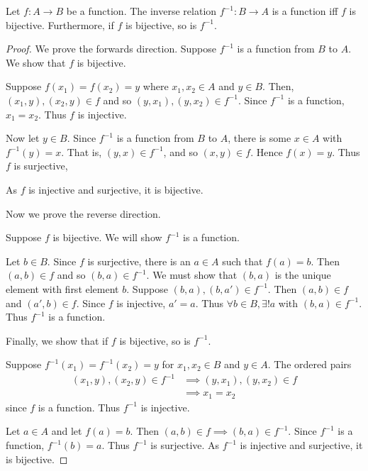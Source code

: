 \documentclass{article}
\begin{document}
    \begin{theorem}
      Let $f: A \to B$ be a function. The inverse relation $f^{-1}: B \to A$ is a function iff $f$ is bijective. Furthermore, if $f$ is bijective, so is $f^{-1}$.
    \end{theorem}
    \begin{proof}
      We prove the forwards direction.
      Suppose $f^{-1}$ is a function from $B$ to $A$. We show that $f$ is bijective.

      Suppose $f(x_1) = f(x_2) = y$ where $x_1, x_2 \in A$ and $y \in B$.
      Then, $(x_1, y), (x_2, y) \in f$ and so $(y, x_1), (y, x_2) \in f^{-1}$. Since $f^{-1}$ is a function, $x_1 = x_2$.
      Thus $f$ is injective.

      Now let $y \in B$. Since $f^{-1}$ is a function from $B$ to $A$, there is some $x \in A$ with $f^{-1}(y) = x$. That is, $(y, x) \in f^{-1}$, and so $(x, y) \in f$. Hence $f(x) = y$. Thus $f$ is surjective,

      As $f$ is injective and surjective, it is bijective.

      Now we prove the reverse direction.

      Suppose $f$ is bijective. We will show $f^{-1}$ is a function.

      Let $b \in B$. Since $f$ is surjective, there is an $a \in A$ such that $f(a) = b$. Then $(a, b) \in f$ and so $(b, a) \in f^{-1}$. We must show that $(b, a)$ is the unique element with first element $b$. Suppose $(b, a), (b, a') \in f^{-1}$. Then $(a, b) \in f$ and $(a', b) \in f$. Since $f$ is injective, $a' = a$. Thus $\forall b \in B, \exists! a$ with $(b, a) \in f^{-1}$. Thus $f^{-1}$ is a function.

      Finally, we show that if $f$ is bijective, so is $f^{-1}$.

      Suppose $f^{-1}(x_1) = f^{-1}(x_2) = y$ for $x_1, x_2 \in B$ and $y \in A$. The ordered pairs
      \begin{align*}
        (x_1, y), (x_2, y) \in f^{-1} &\implies (y, x_1), (y, x_2) \in f\\
        &\implies x_1 = x_2
      \end{align*}
      since $f$ is a function. Thus $f^{-1}$ is injective.

      Let $a \in A$ and let $f(a) = b$. Then $(a, b) \in f \implies (b, a) \in f^{-1}$. Since $f^{-1}$ is a function, $f^{-1}(b) = a$. Thus $f^{-1}$ is surjective. As $f^{-1}$ is injective and surjective, it is bijective.
    \end{proof}
\end{document}
